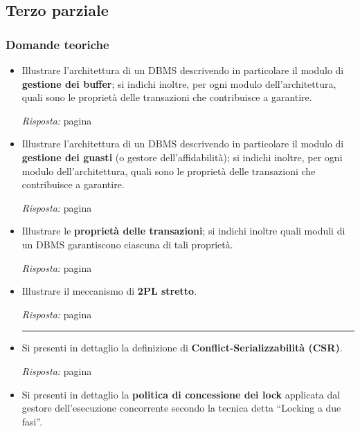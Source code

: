 \documentclass[a4paper]{article}
\newcommand{\longline}{\noindent\rule{\textwidth}{0.4pt}}
\newcommand{\dquotes}[1]{``#1''}
\begin{document}
	\subsection{Terzo parziale}
	
	\subsubsection{Domande teoriche}
	
	\begin{itemize}
		\item Illustrare l'architettura di un DBMS descrivendo in particolare il modulo di \textbf{gestione dei buffer}; si indichi inoltre, per ogni modulo dell'architettura, quali sono le proprietà delle transazioni che contribuisce a garantire.
		
		\emph{Risposta:} pagina \pageref{dom: gestione del buffer}
		
		\item Illustrare l'architettura di un DBMS descrivendo in particolare il modulo di \textbf{gestione dei guasti} (o gestore dell'affidabilità); si indichi inoltre, per ogni modulo dell'architettura, quali sono le proprietà delle transazioni che contribuisce a garantire.
		
		\emph{Risposta:} pagina \pageref{dom: gestione dei guasti}
		
		\item Illustrare le \textbf{proprietà delle transazioni}; si indichi inoltre quali moduli di un DBMS garantiscono ciascuna di tali proprietà.
		
		\emph{Risposta:} pagina \pageref{dom: proprietà delle transazioni}
		
		\item Illustrare il meccanismo di \textbf{2PL stretto}.
		
		\emph{Risposta:} pagina \pageref{dom: 2PL stretto}
		
		\longline
		
		\item Si presenti in dettaglio la definizione di \textbf{Conflict-Serializzabilità (CSR)}.
		
		\emph{Risposta:} pagina \pageref{dom: CSR - Conflict-Serializzabilità}
		
		\item Si presenti in dettaglio la \textbf{politica di concessione dei lock} applicata dal gestore dell'esecuzione concorrente secondo la tecnica detta \dquotes{Locking a due fasi}.
		

\end{itemize}
\end{document}

